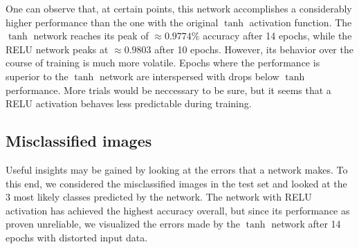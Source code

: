 \documentclass[11pt, a4paper]{article}
\begin{document}
One can observe that, at certain points, this network accomplishes a considerably higher performance than the one with the original $\tanh$ activation function. The $\tanh$ network reaches its peak of $\approx 0.9774$\% accuracy after 14 epochs, while the RELU network peaks at $\approx 0.9803$ after 10 epochs. However, its behavior over the course of training is much more volatile. Epochs where the performance is superior to the $\tanh$ network are interspersed with drops below $\tanh$ performance. More trials would be neccessary to be sure, but it seems that a RELU activation behaves less predictable during training.

\subsection{Misclassified images}
Useful insights may be gained by looking at the errors that a network makes. To this end, we considered the misclassified images in the test set and looked at the 3 most likely classes predicted by the network. The network with RELU activation has achieved the highest accuracy overall, but since its performance as proven unreliable, we visualized the errors made by the $\tanh$ network after 14 epochs with distorted input data.
\end{document}
